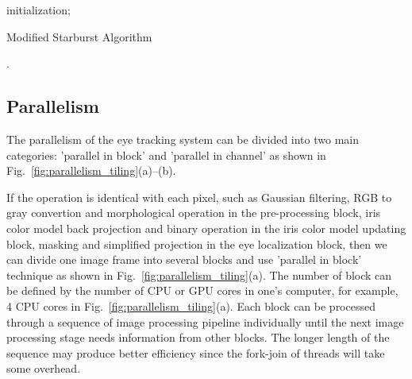 \documentclass[sigconf]{acmart}
\begin{document}
\begin{algorithm}[t]
  initialization;\\
\caption{Modified Starburst Algorithm}
\label{alg:starburst}.
\end{algorithm}

\subsection{Parallelism}
The parallelism of the eye tracking system can be divided into two main categories: 'parallel in block' and 'parallel in channel' as shown in Fig.~\ref{fig:parallelism_tiling}(a)--(b).

If the operation is identical with each pixel, such as Gaussian filtering, RGB to gray convertion and morphological operation in the pre-processing block, iris color model back projection and binary operation in the iris color model updating block, masking and simplified projection in the eye localization block, then we can divide one image frame into several blocks and use 'parallel in block' technique as shown in Fig.~\ref{fig:parallelism_tiling}(a). The number of block can be defined by the number of CPU or GPU cores in one's computer, for example, 4 CPU cores in Fig.~\ref{fig:parallelism_tiling}(a). Each block can be processed through a sequence of image processing pipeline individually until the next image processing stage needs information from other blocks. The longer length of the sequence may produce better efficiency since the fork-join of threads will take some overhead.
\end{document}
